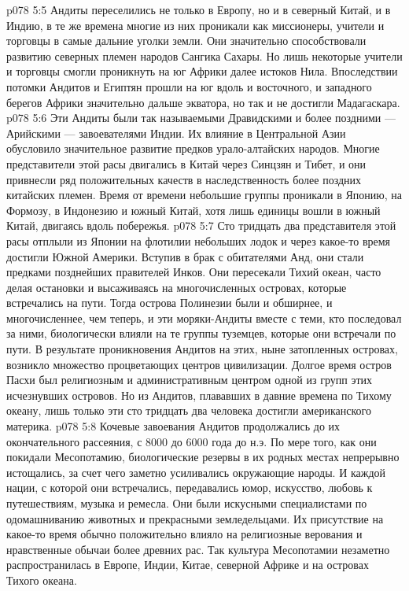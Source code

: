 \vs p078 5:5 \pc Андиты переселились не только в Европу, но и в северный Китай, и в Индию, в те же времена многие из них проникали как миссионеры, учители и торговцы в самые дальние уголки земли. Они значительно способствовали развитию северных племен народов Сангика Сахары. Но лишь некоторые учители и торговцы смогли проникнуть на юг Африки далее истоков Нила. Впоследствии потомки Андитов и Египтян прошли на юг вдоль и восточного, и западного берегов Африки значительно дальше экватора, но так и не достигли Мадагаскара.
\vs p078 5:6 Эти Андиты были так называемыми Дравидскими и более поздними --- Арийскими --- завоевателями Индии. Их влияние в Центральной Азии обусловило значительное развитие предков урало\hyp{}алтайских народов. Многие представители этой расы двигались в Китай через Синцзян и Тибет, и они привнесли ряд положительных качеств в наследственность более поздних китайских племен. Время от времени небольшие группы проникали в Японию, на Формозу, в Индонезию и южный Китай, хотя лишь единицы вошли в южный Китай, двигаясь вдоль побережья.
\vs p078 5:7 Сто тридцать два представителя этой расы отплыли из Японии на флотилии небольших лодок и через какое\hyp{}то время достигли Южной Америки. Вступив в брак с обитателями Анд, они стали предками позднейших правителей Инков. Они пересекали Тихий океан, часто делая остановки и высаживаясь на многочисленных островах, которые встречались на пути. Тогда острова Полинезии были и обширнее, и многочисленнее, чем теперь, и эти моряки\hyp{}Андиты вместе с теми, кто последовал за ними, биологически влияли на те группы туземцев, которые они встречали по пути. В результате проникновения Андитов на этих, ныне затопленных островах, возникло множество процветающих центров цивилизации. Долгое время остров Пасхи был религиозным и административным центром одной из групп этих исчезнувших островов. Но из Андитов, плававших в давние времена по Тихому океану, лишь только эти сто тридцать два человека достигли американского материка.
\vs p078 5:8 \pc Кочевые завоевания Андитов продолжались до их окончательного рассеяния, с 8000 до 6000 года до н.э. По мере того, как они покидали Месопотамию, биологические резервы в их родных местах непрерывно истощались, за счет чего заметно усиливались окружающие народы. И каждой нации, с которой они встречались, передавались юмор, искусство, любовь к путешествиям, музыка и ремесла. Они были искусными специалистами по одомашниванию животных и прекрасными земледельцами. Их присутствие на какое\hyp{}то время обычно положительно влияло на религиозные верования и нравственные обычаи более древних рас. Так культура Месопотамии незаметно распространилась в Европе, Индии, Китае, северной Африке и на островах Тихого океана.
